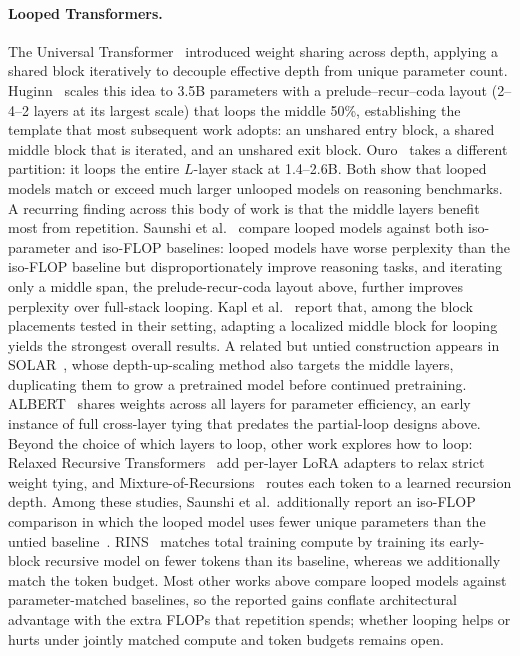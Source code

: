 \documentclass[]{bytedance_seed}
\theoremstyle{definition}
\theoremstyle{remark}
\begin{document}
\paragraph{Looped Transformers.}
The Universal Transformer~\cite{dehghani2019universal} introduced weight sharing across depth, applying a shared block iteratively to decouple effective depth from unique parameter count.
%
Huginn~\cite{geiping2025scaling} scales this idea to 3.5B parameters with a prelude--recur--coda layout (2--4--2 layers at its largest scale) that loops the middle 50\%, establishing the template that most subsequent work adopts: an unshared entry block, a shared middle block that is iterated, and an unshared exit block.
%
Ouro~\cite{zhu2025scaling} takes a different partition: it loops the entire $L$-layer stack at 1.4--2.6B.
%
Both show that looped models match or exceed much larger unlooped models on reasoning benchmarks.
%
A recurring finding across this body of work is that the middle layers benefit most from repetition.
%
Saunshi et al.~\cite{saunshi2025reasoning} compare looped models against both iso-parameter and iso-FLOP baselines: looped models have worse perplexity than the iso-FLOP baseline but disproportionately improve reasoning tasks, and iterating only a middle span, the prelude-recur-coda layout above, further improves perplexity over full-stack looping.
%
Kapl et al.~\cite{kapl2026growing} report that, among the block placements tested in their setting, adapting a localized middle block for looping yields the strongest overall results.
%
A related but untied construction appears in SOLAR~\cite{kim2024solar}, whose depth-up-scaling method also targets the middle layers, duplicating them to grow a pretrained model before continued pretraining.
%
ALBERT~\cite{lan2020albert} shares weights across all layers for parameter efficiency, an early instance of full cross-layer tying that predates the partial-loop designs above.
%
Beyond the choice of which layers to loop, other work explores how to loop: Relaxed Recursive Transformers~\cite{bae2025relaxed} add per-layer LoRA adapters to relax strict weight tying, and Mixture-of-Recursions~\cite{bae2025mixture} routes each token to a learned recursion depth.
%
Among these studies, Saunshi et al.\ additionally report an iso-FLOP comparison in which the looped model uses fewer unique parameters than the untied baseline~\cite{saunshi2025reasoning}.
%
RINS~\cite{alabdulmohsin2025recursive} matches total training compute by training its early-block recursive model on fewer tokens than its baseline, whereas we additionally match the token budget.
%
Most other works above compare looped models against parameter-matched baselines, so the reported gains conflate architectural advantage with the extra FLOPs that repetition spends; whether looping helps or hurts under jointly matched compute and token budgets remains open.
%
\end{document}
